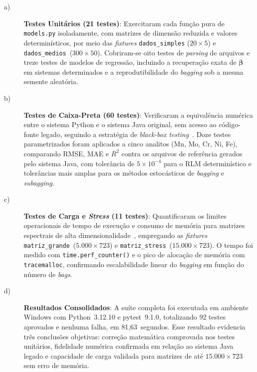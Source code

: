 \begin{description}

\item[a)] \textbf{Testes Unitários (21 testes)}: Exercitaram cada função pura
de \texttt{models.py} isoladamente, com matrizes de dimensão reduzida e valores
determinísticos, por meio das \textit{fixtures} \texttt{dados\_simples}
($20\times5$) e \texttt{dados\_medios}~($300\times50$). Cobriram-se oito testes
de \textit{parsing} de arquivos e treze testes de modelos de regressão,
incluindo a recuperação exata de $\boldsymbol{\beta}$ em sistemas determinados
e a reprodutibilidade do \textit{bagging} sob a mesma semente aleatória.

\item[b)] \textbf{Testes de Caixa-Preta (60 testes)}: Verificaram a equivalência
numérica entre o sistema Python e o sistema Java original, sem acesso ao
código-fonte legado, seguindo a estratégia de \textit{black-box
testing}~\cite{pressman2016}. Doze testes parametrizados foram aplicados a
cinco analitos (Mn, Mo, Cr, Ni, Fe), comparando RMSE, MAE e $R^2$ contra os
arquivos de referência gerados pelo sistema Java, com tolerância de
$5\times10^{-4}$ para o RLM determinístico e tolerâncias mais amplas para os
métodos estocásticos de \textit{bagging} e \textit{subagging}.

\item[c)] \textbf{Testes de Carga e \textit{Stress} (11 testes)}: Quantificaram
os limites operacionais de tempo de execução e consumo de memória para
matrizes espectrais de alta dimensionalidade~\cite{jorgensen2014}, empregando
as \textit{fixtures} \texttt{matriz\_grande}~($5.000\times723$) e
\texttt{matriz\_stress}~($15.000\times723$). O tempo foi medido com
\texttt{time.perf\_counter()} e o pico de alocação de memória com
\texttt{tracemalloc}, confirmando escalabilidade linear do \textit{bagging} em
função do número de \textit{bags}.

\item[d)] \textbf{Resultados Consolidados}: A suíte completa foi executada em
ambiente Windows com Python~3.12.10 e pytest~9.1.0, totalizando 92 testes
aprovados e nenhuma falha, em 81{,}63~segundos. Esse resultado evidencia três
conclusões objetivas: correção matemática comprovada nos testes unitários,
fidelidade numérica confirmada em relação ao sistema Java legado e capacidade
de carga validada para matrizes de até $15.000\times723$ sem erro de memória.

\end{description}
